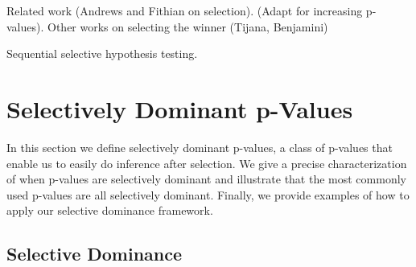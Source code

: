 \documentclass{article}
\begin{document}
Related work (Andrews and Fithian on selection). (Adapt for increasing p-values). Other works on selecting the winner (Tijana, Benjamini) 

Sequential selective hypothesis testing. 





\section{Selectively Dominant p-Values}
\label{sec:dominance}

In this section we define selectively dominant p-values, a class of p-values that enable us to easily do inference after selection. We give a precise characterization of when p-values are selectively dominant and illustrate that the most commonly used p-values are all selectively dominant. Finally, we provide examples of how to apply our selective dominance framework. 

\subsection{Selective Dominance}
\end{document}
